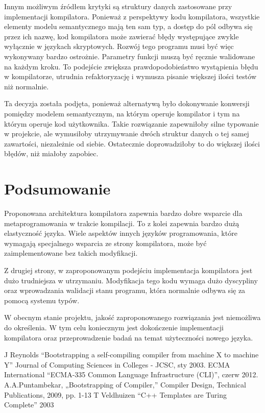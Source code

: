 \documentclass[conference]{IEEEtran}
\begin{document}
Innym możliwym źródłem krytyki są struktury danych zastosowane przy implementacji kompilatora.
Ponieważ z perspektywy kodu kompilatora, wszystkie elementy modelu semantycznego mają ten sam typ, a dostęp do pól odbywa się przez ich nazwę, kod kompilatora może zawierać błędy występujące zwykle wyłącznie w językach skryptowych.
Rozwój tego programu musi być więc wykonywany bardzo ostrożnie.
Parametry funkcji muszą być ręcznie walidowane na każdym kroku.
To podejście zwiększa prawdopodobieństwo wystąpienia błędu w kompilatorze, utrudnia refaktoryzację i wymusza pisanie większej ilości testów niż normalnie.

Ta decyzja została podjęta, ponieważ alternatywą było dokonywanie konwersji pomiędzy modelem semantycznym, na którym operuje kompilator i tym na którym operuje kod użytkownika.
Takie rozwiązanie zapewniłoby silne typowanie w projekcie, ale wymusiłoby utrzymywanie dwóch struktur danych o tej samej zawartości, niezależnie od siebie.
Ostatecznie doprowadziłoby to do większej ilości błędów, niż miałoby zapobiec.



\section{Podsumowanie}

Proponowana architektura kompilatora zapewnia bardzo dobre wsparcie dla metaprogramowania w trakcie kompilacji.
To z kolei zapewnia bardzo dużą elastyczność języka.
Wiele aspektów innych języków programowania, które wymagają specjalnego wsparcia ze strony kompilatora, może być zaimplementowane bez takich modyfikacji.

Z drugiej strony, w zaproponowanym podejściu implementacja kompilatora jest dużo trudniejsza w utrzymaniu.
Modyfikacja tego kodu wymaga dużo dyscypliny oraz wprowadzania walidacji stanu programu, która normalnie odbywa się za pomocą systemu typów.

W obecnym stanie projektu, jakość zaproponowanego rozwiązania jest niemożliwa do określenia.
W tym celu koniecznym jest dokończenie implementacji kompilatora oraz przeprowadzenie badań na temat użyteczności nowego języka.


\begin{thebibliography}{00}
     J Reynolds ``Bootstrapping a self-compiling compiler from machine X to machine Y'' Journal of Computing Sciences in Colleges - JCSC, sty 2003.
    ECMA International ``ECMA-335 Common Language Infrastructure (CLI)'', czerw 2012.
     A.A.Puntambekar, „Bootstrapping of Compiler,” Compiler Design, Technical Publications, 2009, pp. 1-13
     T Veldhuizen ``C++ Templates are Turing Complete'' 2003
\end{thebibliography}
\end{document}
